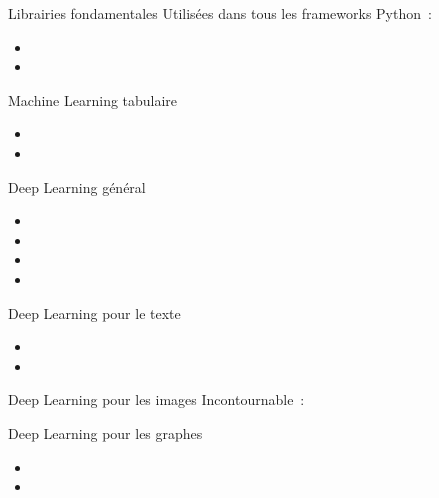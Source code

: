 \begin{frame}{Librairies fondamentales}
  Utilisées dans tous les frameworks Python~:
  \begin{itemize}[<+->]
    \item {}
    \item {}
  \end{itemize}
\end{frame}

\begin{frame}{Machine Learning tabulaire}
  \begin{itemize}[<+->]
    \item {}
    \item {}
  \end{itemize}
\end{frame}

\begin{frame}{Deep Learning général}
  \begin{itemize}[<+->]
    \item {}
    \item {}
    \item {}
    \item {}
  \end{itemize}
\end{frame}

\begin{frame}{Deep Learning pour le texte}
  \begin{itemize}[<+->]
    \item {}
    \item {}
  \end{itemize}
\end{frame}

\begin{frame}{Deep Learning pour les images}
  Incontournable~: 
\end{frame}

\begin{frame}{Deep Learning pour les graphes}
  \begin{itemize}[<+->]
    \item {}
    \item {}
  \end{itemize}
\end{frame}